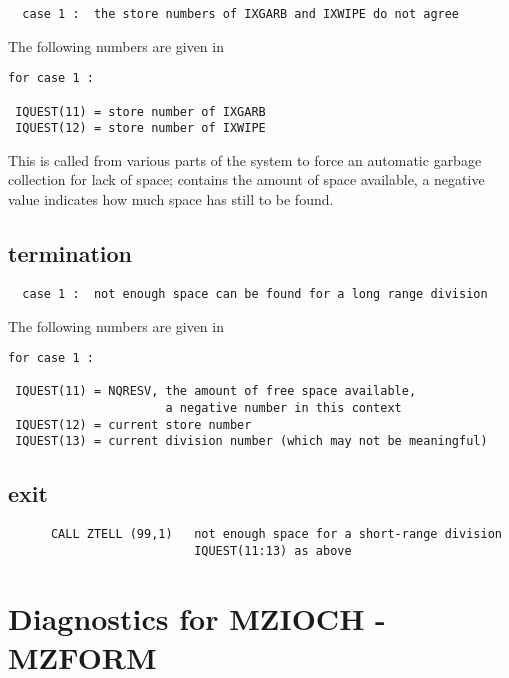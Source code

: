 \begin{verbatim}
  case 1 :  the store numbers of IXGARB and IXWIPE do not agree
\end{verbatim}

The following numbers are given in 

\begin{verbatim}
for case 1 :

 IQUEST(11) = store number of IXGARB
 IQUEST(12) = store number of IXWIPE
\end{verbatim}


This is called from various parts of the system to force
an automatic garbage collection for lack of space;
 contains the amount of space available,
a negative value indicates how much space has still to be found.

\subsection*{ termination}

\begin{verbatim}
  case 1 :  not enough space can be found for a long range division
\end{verbatim}

The following numbers are given in 

\begin{verbatim}
for case 1 :

 IQUEST(11) = NQRESV, the amount of free space available,
                      a negative number in this context
 IQUEST(12) = current store number
 IQUEST(13) = current division number (which may not be meaningful)
\end{verbatim}

\subsection*{ exit}

\begin{verbatim}
      CALL ZTELL (99,1)   not enough space for a short-range division
                          IQUEST(11:13) as above
\end{verbatim}

\section{Diagnostics for MZIOCH - MZFORM}


